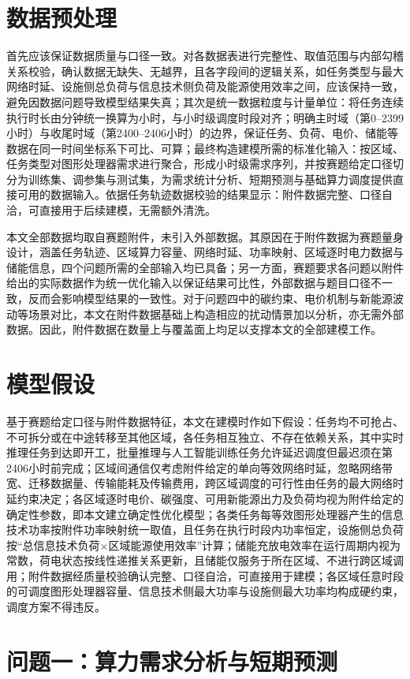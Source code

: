 \documentclass{ctexart}
\begin{document}
\section{数据预处理}
首先应该保证数据质量与口径一致。对各数据表进行完整性、取值范围与内部勾稽关系校验，确认数据无缺失、无越界，且各字段间的逻辑关系，如任务类型与最大网络时延、设施侧总负荷与信息技术侧负荷及能源使用效率之间，应该保持一致，避免因数据问题导致模型结果失真；其次是统一数据粒度与计量单位：将任务连续执行时长由分钟统一换算为小时，与小时级调度时段对齐；明确主时域（第0–2399小时）与收尾时域（第2400–2406小时）的边界，保证任务、负荷、电价、储能等数据在同一时间坐标系下可比、可算；最终构造建模所需的标准化输入：按区域、任务类型对图形处理器需求进行聚合，形成小时级需求序列，并按赛题给定口径切分为训练集、调参集与测试集，为需求统计分析、短期预测与基础算力调度提供直接可用的数据输入。依据任务轨迹数据校验的结果显示：附件数据完整、口径自洽，可直接用于后续建模，无需额外清洗。

本文全部数据均取自赛题附件，未引入外部数据。其原因在于附件数据为赛题量身设计，涵盖任务轨迹、区域算力容量、网络时延、功率映射、区域逐时电力数据与储能信息，四个问题所需的全部输入均已具备；另一方面，赛题要求各问题以附件给出的实际数据作为统一优化输入以保证结果可比性，外部数据与题目口径不一致，反而会影响模型结果的一致性。对于问题四中的碳约束、电价机制与新能源波动等场景对比，本文在附件数据基础上构造相应的扰动情景加以分析，亦无需外部数据。因此，附件数据在数量上与覆盖面上均足以支撑本文的全部建模工作。
\section{模型假设}
基于赛题给定口径与附件数据特征，本文在建模时作如下假设：任务均不可抢占、不可拆分或在中途转移至其他区域，各任务相互独立、不存在依赖关系，其中实时推理任务到达即开工，批量推理与人工智能训练任务允许延迟调度但最迟须在第2406小时前完成；区域间通信仅考虑附件给定的单向等效网络时延，忽略网络带宽、迁移数据量、传输能耗及传输费用，跨区域调度的可行性由任务的最大网络时延约束决定；各区域逐时电价、碳强度、可用新能源出力及负荷均视为附件给定的确定性参数，即本文建立确定性优化模型；各类任务每等效图形处理器产生的信息技术功率按附件功率映射统一取值，且任务在执行时段内功率恒定，设施侧总负荷按“总信息技术负荷$\times$区域能源使用效率”计算；储能充放电效率在运行周期内视为常数，荷电状态按线性递推关系更新，且储能仅服务于所在区域、不进行跨区域调用；附件数据经质量校验确认完整、口径自洽，可直接用于建模；各区域任意时段的可调度图形处理器容量、信息技术侧最大功率与设施侧最大功率均构成硬约束，调度方案不得违反。
\section{问题一：算力需求分析与短期预测}
\end{document}
